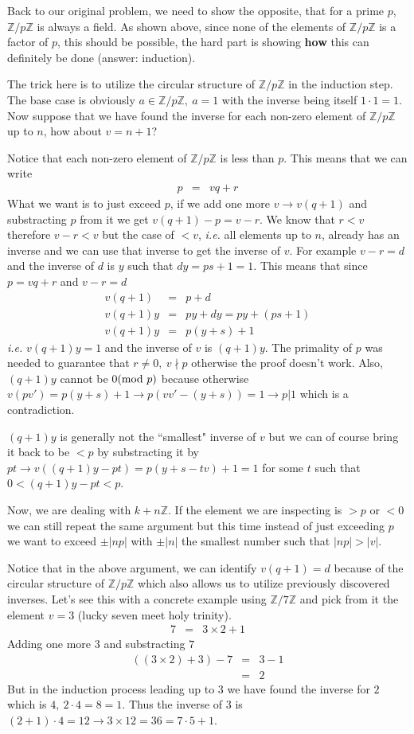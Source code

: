 \documentclass[aps,preprint,preprintnumbers,nofootinbib,showpacs,prd]{revtex4-1}
\newcommand{\ie}{{\it i.e.} }
\newcommand{\nbea}{\begin{eqnarray*}}
\newcommand{\neea}{\end{eqnarray*}}
\begin{document}
Back to our original problem, we need to show the opposite, that for a prime $p$, $\mathbb{Z}/p\mathbb{Z}$ is always a field. As shown above, since none of the elements of $\mathbb{Z}/p\mathbb{Z}$ is a factor of $p$, this should be possible, the hard part is showing {\bf how} this can definitely be done (answer: induction).

The trick here is to utilize the circular structure of $\mathbb{Z}/p\mathbb{Z}$ in the induction step. The base case is obviously $a \in \mathbb{Z}/p\mathbb{Z},~a = 1$ with the inverse being itself $1\cdot 1 = 1$. Now suppose that we have found the inverse for each non-zero element of $\mathbb{Z}/p\mathbb{Z}$ up to $n$, how about $v=n+1$?

Notice that each non-zero element of $\mathbb{Z}/p\mathbb{Z}$ is less than $p$. This means that we can write 
%
\nbea
p & = & vq + r
\neea
%
What we want is to just exceed $p$, if we add one more $v \to v(q + 1)$ and substracting $p$ from it we get $v(q + 1) - p = v - r$. We know that $r < v$ therefore $v - r < v$ but the case of $< v$, \ie all elements up to $n$, already has an inverse and we can use that inverse to get the inverse of $v$. For example $v-r = d$ and the inverse of $d$ is $y$ such that $dy=ps + 1 = 1$. This means that since $p = vq + r$ and $v-r = d$
%
\nbea
v(q+1) & = & p + d \\
v(q+1)y & = & py + dy  = py + (ps + 1)\\
v(q+1)y & = & p(y+s) + 1 
\neea
%
\ie $v(q+1)y = 1$ and the inverse of $v$ is $(q+1)y$. The primality of $p$ was needed to guarantee that $r \neq 0,~v \nmid p$ otherwise the proof doesn't work. Also, $(q+1)y$ cannot be $0({\rm mod~}p)$ because otherwise $v(pv') = p(y+s) + 1 \to p(vv' - (y+s)) = 1\to p|1$ which is a contradiction.

$(q+1)y$ is generally not the ``smallest" inverse of $v$ but we can of course bring it back to be $< p$ by substracting it by $pt \to v((q+1)y -pt) = p(y+s-tv) + 1 = 1$ for some $t$ such that $0 < (q+1)y -pt < p$.

Now, we are dealing with $k + n\mathbb{Z}$. If the element we are inspecting is $> p$ or $< 0$ we can still repeat the same argument but this time instead of just exceeding $p$ we want to exceed $\pm|np|$ with $\pm|n|$ the smallest number such that $|np| > |v|$.

Notice that in the above argument, we can identify $v(q+1) = d$ because of the circular structure of $\mathbb{Z}/p\mathbb{Z}$ which also allows us to utilize previously discovered inverses. Let's see this with a concrete example using $\mathbb{Z}/7\mathbb{Z}$ and pick from it the element $v = 3$ (lucky seven meet holy trinity).
%
\nbea
7 & = & 3 \times 2 + 1
\neea
%
Adding one more $3$ and substracting $7$
%
\nbea
((3 \times 2) + 3) - 7 & = & 3 - 1 \\
& = & 2
\neea
%
But in the induction process leading up to $3$ we have found the inverse for $2$ which is $4, ~2\cdot 4 = 8 = 1$. Thus the inverse of $3$ is $(2+1)\cdot 4 = 12 \to 3 \times 12 = 36 = 7\cdot 5 + 1$.
\end{document}
